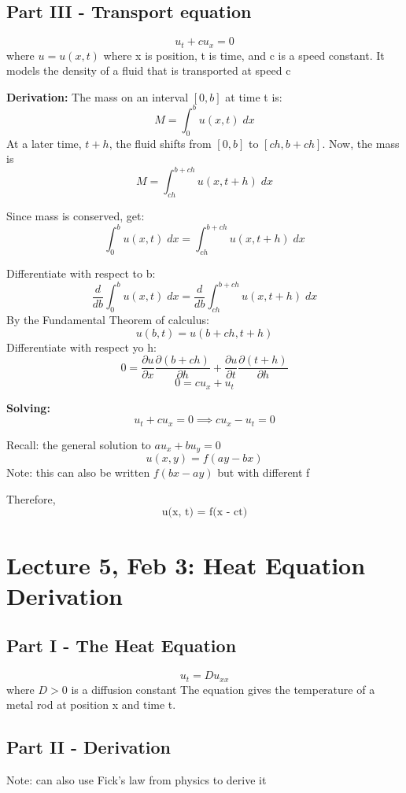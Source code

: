 \documentclass[12pt]{article}
\newcommand{\ans}[1]{\boxed{\text{#1}}}
\begin{document}
\subsection*{Part III - Transport equation}
\[u_t + cu_x = 0\]
where $u = u(x, t)$ where x is position, t is time, and c is a speed constant. 
It models the density of a fluid that is transported at speed c  

\textbf{Derivation:}
The mass on an interval $[0, b]$ at time t is:
\[M = \int_0^b u(x, t) \; dx\]
At a later time, $t + h$, the fluid shifts from $[0, b]$ to $[ch, b + ch]$. Now, the mass is 
\[M = \int_{ch}^{b+ch} u(x, t + h)\; dx\]

Since mass is conserved, get:
\[\int_0^b u(x, t) \; dx = \int_{ch}^{b+ch} u(x, t + h)\; dx\]

Differentiate with respect to b:
\[\frac{d}{db} \int_0^b u(x, t) \; dx = \frac{d}{db} \int_{ch}^{b+ch} u(x, t + h)\; dx\]
By the Fundamental Theorem of calculus:
\[u(b, t) = u(b+ch, t + h)\]
Differentiate with respect yo h:
\[0 = \frac{\partial u}{\partial x} \frac{\partial (b + ch)}{\partial h} + \frac{\partial u}{\partial t} \frac{\partial (t+h)}{\partial h}\]
\[0 = cu_x + u_t\]

\textbf{Solving:}
\[u_t + cu_x = 0 \implies cu_x - u_t = 0\]

Recall: the general solution to $au_x + bu_y = 0$
\[u(x, y) = f(ay - bx)\]
Note: this can also be written $f(bx - ay)$ but with different f 

Therefore, 
\[\ans{u(x, t) = f(x - ct)}\]

\section*{Lecture 5, Feb 3: Heat Equation Derivation}
\subsection*{Part I - The Heat Equation}
\[u_t = Du_{xx}\]
where $D > 0$ is a diffusion constant
The equation gives the temperature of a metal rod at position x and time t.

\subsection*{Part II - Derivation}
Note: can also use Fick's law from physics to derive it
\end{document}
